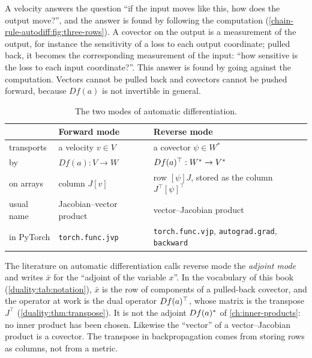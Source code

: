 \begin{notechapter}
\begin{intuition}
A velocity answers the question ``if the input moves like this, how does
the output move?'', and the answer is found by following the computation
(\cref{chain-rule-autodiff:fig:three-rows}).
A covector on the output is a measurement of the output, for instance the
sensitivity of a loss to each output coordinate; pulled back, it becomes
the corresponding measurement of the input: ``how sensitive is the loss to
each input coordinate?''. This answer is found by going against the
computation. Vectors cannot be pulled back and covectors cannot be pushed
forward, because $Df(a)$ is not invertible in general.
\end{intuition}

\begin{table}[ht]
\centering
\small
\begin{tabular}{@{}lll@{}}
\toprule
 & Forward mode & Reverse mode \\
\midrule
transports & a velocity $v\in V$ & a covector $\psi\in W^*$ \\
by & $Df(a):V\to W$ & $Df(a)^{\top}:W^*\to V^*$ \\
on arrays & column $J[v]$ & row $[\psi]J$, stored as the column
  $J^\top[\psi]^\top$ \\
usual name & Jacobian--vector product & vector--Jacobian product \\
in PyTorch & \texttt{torch.func.jvp} & \texttt{torch.func.vjp},
  \texttt{autograd.grad}, \texttt{backward} \\
\bottomrule
\end{tabular}
\caption{The two modes of automatic differentiation.}
\label{chain-rule-autodiff:tab:modes}
\end{table}

\begin{pitfall}
The literature on automatic differentiation calls reverse mode the
\emph{adjoint mode} and writes $\bar x$ for the ``adjoint of the variable
$x$''. In the vocabulary of this book (\cref{duality:tab:notation}),
$\bar x$ is the row of components of a pulled-back covector, and the
operator at work is the dual operator $Df(a)^{\top}$, whose matrix is the
transpose $J^\top$ (\cref{duality:thm:transpose}). It is not the adjoint
$Df(a)^{*}$ of \cref{ch:inner-products}: no inner product has been
chosen. Likewise the ``vector'' of a vector--Jacobian product is a
covector. The transpose in backpropagation comes from storing rows as
columns, not from a metric.
\end{pitfall}


\end{notechapter}

